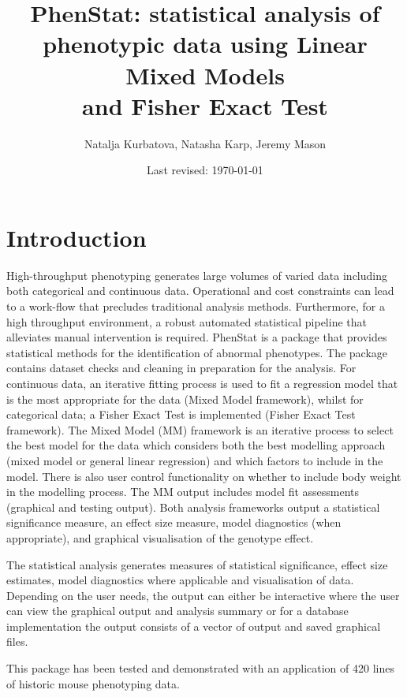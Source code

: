 \documentclass[12pt,a4paper]{article}
\title{PhenStat: statistical analysis of phenotypic data using Linear Mixed Models \\and Fisher Exact Test}
\author{Natalja Kurbatova, Natasha Karp, Jeremy Mason}
\date{Last revised: \today}
\begin{document}
\maketitle
\newpage
\tableofcontents
\newpage
\section{Introduction}
High-throughput phenotyping generates large volumes of varied data including both categorical and continuous data. Operational and cost constraints can lead to a work-flow that precludes traditional analysis methods. Furthermore, for a high throughput environment, a robust automated statistical pipeline that alleviates manual intervention is required. 
PhenStat is a package that provides statistical methods for the identification of abnormal phenotypes. The package contains dataset checks and cleaning in preparation for the analysis. For continuous data, an iterative fitting process is used to fit a regression model that is the most appropriate for the data (Mixed Model framework), whilst for categorical data; a Fisher Exact Test is implemented (Fisher Exact Test framework). 
The Mixed Model (MM) framework is an iterative process to select the best model for the data which considers both the best modelling approach (mixed model or general linear regression) and which factors to include in the model. There is also user control functionality on whether to include body weight in the modelling process. The MM output includes model fit assessments (graphical and testing output). Both analysis frameworks output a statistical significance measure, an effect size measure, model diagnostics (when appropriate), and graphical visualisation of the genotype effect. 

The statistical analysis generates measures of statistical significance, effect size estimates, model diagnostics where applicable and visualisation of data. Depending on the user needs, the output can either be interactive where the user can view the graphical output and analysis summary or for a database implementation the output consists of a vector of output and saved graphical files. 

This package has been tested and demonstrated with an application of 420 lines of historic mouse phenotyping data. 
\\
\end{document}
